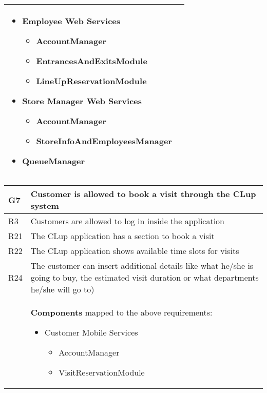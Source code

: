 \begin{center}
{\begin{longtable}{L{2.5cm}L{12cm}}
        \medskip 
        \begin{itemize}
            \item Employee Web Services \begin{itemize}
                \item AccountManager
                \item EntrancesAndExitsModule
                \item LineUpReservationModule
            \end{itemize}
            \item Store Manager Web Services \begin{itemize}
                \item AccountManager
                \item StoreInfoAndEmployeesManager
            \end{itemize}
            \item QueueManager
        \end{itemize} \\
        \hline
    \end{longtable}}

        {\renewcommand{\arraystretch}{1.5}
        \begin{longtable}{L{2.5cm}L{12cm}}
            \hline
            \textbf{G7} & \textbf{Customer is allowed to book a visit through the CLup system} \\
            \hline
             R3 & Customers are allowed to log in inside the application \\
            \hline
             R21 & The CLup application has a section to book a visit \\
            \hline
             R22 & The CLup application shows available time slots for visits \\
            \hline
             R24 & The customer can insert additional details like what he/she is going to buy, the estimated visit duration or what departments he/she will go to) \\
            \hline
             & \textbf{Components} mapped to the above requirements:

            \medskip 
            \begin{itemize}
                \item Customer Mobile Services \begin{itemize}
                    \item AccountManager
                    \item VisitReservationModule
                \end{itemize}
            \end{itemize} \\
            \hline
        \end{longtable}}


\end{center}
